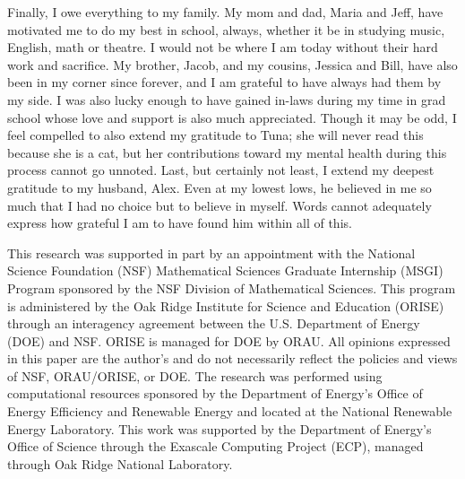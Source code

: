 \documentclass[11pt,expanded,copyright]{fsuthesis}
\begin{document}
\begin{acknowledgments}
Finally, I owe everything to my family. My mom and dad, Maria and Jeff, have motivated me to do my best in school, always, whether it be in studying music, English, math or theatre. I would not be where I am today without their hard work and sacrifice. My brother, Jacob, and my cousins, Jessica and Bill, have also been in my corner since forever, and I am grateful to have always had them by my side. I was also lucky enough to have gained in-laws during my time in grad school whose love and support is also much appreciated. Though it may be odd, I feel compelled to also extend my gratitude to Tuna; she will never read this because she is a cat, but her contributions toward my mental health during this process cannot go unnoted. Last, but certainly not least, I extend my deepest gratitude to my husband, Alex. Even at my lowest lows, he believed in me so much that I had no choice but to believe in myself. Words cannot adequately express how grateful I am to have found him within all of this. 

This research was supported in part by an appointment with the National Science Foundation (NSF) Mathematical Sciences Graduate Internship (MSGI) Program sponsored by the NSF Division of Mathematical Sciences. This program is administered by the Oak Ridge Institute for Science and Education (ORISE) through an interagency agreement between the U.S. Department of Energy (DOE) and NSF. ORISE is managed for DOE by ORAU. All opinions expressed in this paper are the author's and do not necessarily reflect the policies and views of NSF, ORAU/ORISE, or DOE. 
The research was performed using computational resources sponsored by the Department of Energy's Office of Energy Efficiency and Renewable Energy and located at the National Renewable Energy Laboratory. 
This work was supported by the Department of Energy's Office of Science through the Exascale Computing Project (ECP), managed through Oak Ridge National Laboratory.




\end{acknowledgments}

\tableofcontents
\listoftables
\listoffigures


\end{document}
